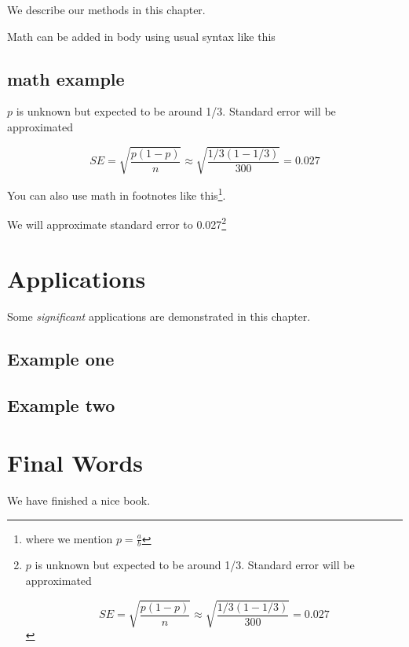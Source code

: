 \documentclass[
]{book}
\begin{document}
We describe our methods in this chapter.

Math can be added in body using usual syntax like this

\section{math example}\label{math-example}

\(p\) is unknown but expected to be around 1/3. Standard error will be approximated

\[
SE = \sqrt{\frac{p(1-p)}{n}} \approx \sqrt{\frac{1/3 (1 - 1/3)} {300}} = 0.027
\]

You can also use math in footnotes like this\footnote{where we mention \(p = \frac{a}{b}\)}.

We will approximate standard error to 0.027\footnote{\(p\) is unknown but expected to be around 1/3. Standard error will be approximated

  \[
  SE = \sqrt{\frac{p(1-p)}{n}} \approx \sqrt{\frac{1/3 (1 - 1/3)} {300}} = 0.027
  \]}

\chapter{Applications}\label{applications}

Some \emph{significant} applications are demonstrated in this chapter.

\section{Example one}\label{example-one}

\section{Example two}\label{example-two}

\chapter{Final Words}\label{final-words}

We have finished a nice book.


\end{document}
